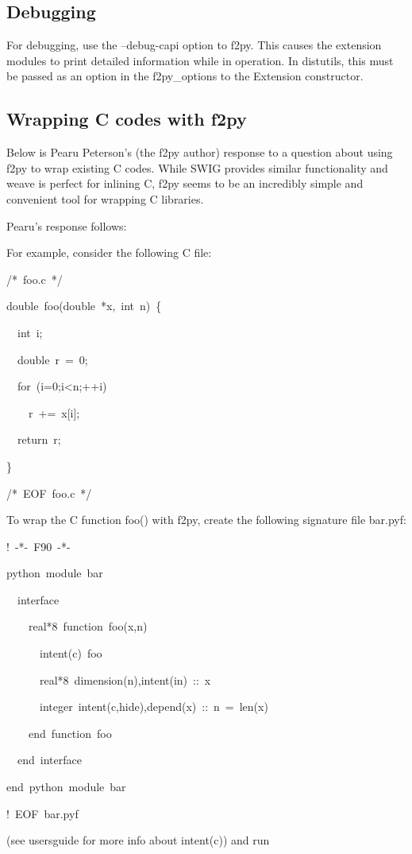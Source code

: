 \subsection{Debugging}

For debugging, use the --debug-capi option to f2py. This causes the
extension modules to print detailed information while in operation.
In distutils, this must be passed as an option in the f2py\_options
to the Extension constructor. 


\subsection{Wrapping C codes with f2py}

Below is Pearu Peterson's (the f2py author) response to a question
about using f2py to wrap existing C codes. While SWIG provides similar
functionality and weave is perfect for inlining C, f2py seems to be
an incredibly simple and convenient tool for wrapping C libraries.

Pearu's response follows: 

For example, consider the following C file:

\begin{lyxcode}
/{*}~foo.c~{*}/

double~foo(double~{*}x,~int~n)~\{

~~int~i;

~~double~r~=~0;

~~for~(i=0;i<n;++i)

~~~~r~+=~x{[}i];

~~return~r;

\}

/{*}~EOF~foo.c~{*}/
\end{lyxcode}
To wrap the C function foo() with f2py, create the following signature
file bar.pyf: 

\begin{lyxcode}
!~-{*}-~F90~-{*}-

python~module~bar

~~interface

~~~~real{*}8~function~foo(x,n)

~~~~~~intent(c)~foo

~~~~~~real{*}8~dimension(n),intent(in)~::~x

~~~~~~integer~intent(c,hide),depend(x)~::~n~=~len(x)

~~~~end~function~foo

~~end~interface

end~python~module~bar

!~EOF~bar.pyf
\end{lyxcode}
(see usersguide for more info about intent(c)) and run

